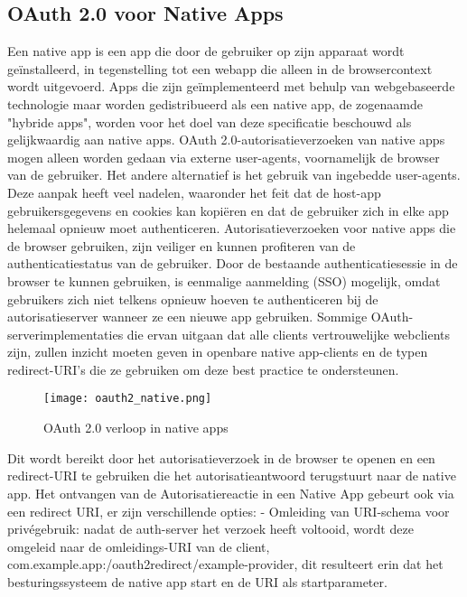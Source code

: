 \subsection{OAuth 2.0 voor Native Apps}%
\label{subsec:oauth-2.0-voor-native-apps}
\autocite{Denniss2017}
Een native app is een app die door de gebruiker op zijn apparaat wordt geïnstalleerd, in tegenstelling tot een webapp die alleen in de browsercontext wordt uitgevoerd. Apps die zijn geïmplementeerd met behulp van webgebaseerde technologie maar worden gedistribueerd als een native app, de zogenaamde "hybride apps", worden voor het doel van deze specificatie beschouwd als gelijkwaardig aan native apps.
OAuth 2.0-autorisatieverzoeken van native apps mogen alleen worden gedaan via externe user-agents, voornamelijk de browser van de gebruiker. Het andere alternatief is het gebruik van ingebedde user-agents. Deze aanpak heeft veel nadelen, waaronder het feit dat de host-app gebruikersgegevens en cookies kan kopiëren en dat de gebruiker zich in elke app helemaal opnieuw moet authenticeren. Autorisatieverzoeken voor native apps die de browser gebruiken, zijn veiliger en kunnen profiteren van de authenticatiestatus van de gebruiker. Door de bestaande authenticatiesessie in de browser te kunnen gebruiken, is eenmalige aanmelding (SSO) mogelijk, omdat gebruikers zich niet telkens opnieuw hoeven te authenticeren bij de autorisatieserver wanneer ze een nieuwe app gebruiken.
Sommige OAuth-serverimplementaties die ervan uitgaan dat alle clients vertrouwelijke webclients zijn, zullen inzicht moeten geven in openbare native app-clients en de typen redirect-URI's die ze gebruiken om deze best practice te ondersteunen.
\begin{figure}[h]
  \centering
  \texttt{[image: oauth2\_native.png]}
  \caption{OAuth 2.0 verloop in native apps}
  \label{fig:example}
\end{figure}
\newline
Dit wordt bereikt door het autorisatieverzoek in de browser te openen en een redirect-URI te gebruiken die het autorisatieantwoord terugstuurt naar de native app.
\newline
\newline
Het ontvangen van de Autorisatiereactie in een Native App gebeurt ook via een redirect URI, er zijn verschillende opties:
\newline
- Omleiding van URI-schema voor privégebruik: nadat de auth-server het verzoek heeft voltooid, wordt deze omgeleid naar de omleidings-URI van de client, com.example.app:/oauth2redirect/example-provider, dit resulteert erin dat het besturingssysteem de native app start en de URI als startparameter.
